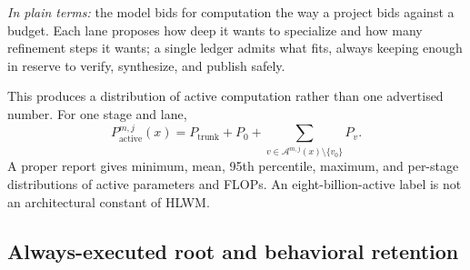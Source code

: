 \documentclass[10pt,a4paper]{article}
\newcommand{\Acal}{\mathcal{A}}
\begin{document}
\emph{In plain terms:} the model bids for computation the way a project bids
against a budget. Each lane proposes how deep it wants to specialize and how
many refinement steps it wants; a single ledger admits what fits, always
keeping enough in reserve to verify, synthesize, and publish safely.

This produces a distribution of active computation rather than one advertised
number. For one stage and lane,
\begin{equation}
P^{m,j}_{\mathrm{active}}(x) = P_{\mathrm{trunk}} + P_0
+ \sum_{v \in \Acal^{m,j}(x) \setminus \{v_0\}} P_v .
\end{equation}
A proper report gives minimum, mean, 95th percentile, maximum, and per-stage
distributions of active parameters and FLOPs. An eight-billion-active label is
not an architectural constant of HLWM.

\subsection{Always-executed root and behavioral retention}
\label{sec:root}
\end{document}
